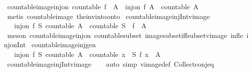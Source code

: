 \begin{isabellebody}
\isamarkupfalse%
%
\endisatagproof
{\isafoldproof}%
%
\isadelimproof
\isanewline
%
\endisadelimproof
\isanewline
{}\isamarkupfalse%
\ countable{\isacharunderscore}image{\isacharunderscore}inj{\isacharunderscore}on{\isacharcolon}\ {\isachardoublequoteopen}countable\ {\isacharparenleft}f\ {\isacharbackquote}\ A{\isacharparenright}\ {\isasymLongrightarrow}\ inj{\isacharunderscore}on\ f\ A\ {\isasymLongrightarrow}\ countable\ A{\isachardoublequoteclose}\isanewline
%
\isadelimproof
\ \ %
\endisadelimproof
%
\isatagproof
{}\isamarkupfalse%
\ {\isacharparenleft}metis\ countable{\isacharunderscore}image\ the{\isacharunderscore}inv{\isacharunderscore}into{\isacharunderscore}onto{\isacharparenright}%
\endisatagproof
{\isafoldproof}%
%
\isadelimproof
\isanewline
%
\endisadelimproof
\isanewline
{}\isamarkupfalse%
\ countable{\isacharunderscore}image{\isacharunderscore}inj{\isacharunderscore}Int{\isacharunderscore}vimage{\isacharcolon}\isanewline
\ \ \ {\isachardoublequoteopen}{\isasymlbrakk}inj{\isacharunderscore}on\ f\ S{\isacharsemicolon}\ countable\ A{\isasymrbrakk}\ {\isasymLongrightarrow}\ countable\ {\isacharparenleft}S\ {\isasyminter}\ f\ {\isacharminus}{\isacharbackquote}\ A{\isacharparenright}{\isachardoublequoteclose}\isanewline
%
\isadelimproof
\ \ %
\endisadelimproof
%
\isatagproof
{}\isamarkupfalse%
\ {\isacharparenleft}meson\ countable{\isacharunderscore}image{\isacharunderscore}inj{\isacharunderscore}on\ countable{\isacharunderscore}subset\ image{\isacharunderscore}subset{\isacharunderscore}iff{\isacharunderscore}subset{\isacharunderscore}vimage\ inf{\isacharunderscore}le{}\ inj{\isacharunderscore}on{\isacharunderscore}Int{\isacharparenright}%
\endisatagproof
{\isafoldproof}%
%
\isadelimproof
\isanewline
%
\endisadelimproof
\isanewline
{}\isamarkupfalse%
\ countable{\isacharunderscore}image{\isacharunderscore}inj{\isacharunderscore}gen{\isacharcolon}\isanewline
\ \ \ {\isachardoublequoteopen}{\isasymlbrakk}inj{\isacharunderscore}on\ f\ S{\isacharsemicolon}\ countable\ A{\isasymrbrakk}\ {\isasymLongrightarrow}\ countable\ {\isacharbraceleft}x\ {\isasymin}\ S{\isachardot}\ f\ x\ {\isasymin}\ A{\isacharbraceright}{\isachardoublequoteclose}\isanewline
%
\isadelimproof
\ \ %
\endisadelimproof
%
\isatagproof
{}\isamarkupfalse%
\ countable{\isacharunderscore}image{\isacharunderscore}inj{\isacharunderscore}Int{\isacharunderscore}vimage\isanewline
\ \ \isamarkupfalse%
\ {\isacharparenleft}auto\ simp{\isacharcolon}\ vimage{\isacharunderscore}def\ Collect{\isacharunderscore}conj{\isacharunderscore}eq{\isacharparenright}%

\end{isabellebody}
